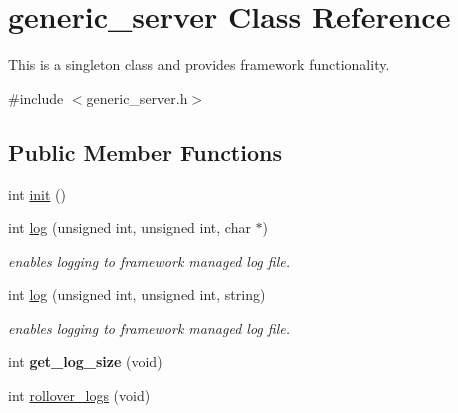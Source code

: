 \hypertarget{classgeneric__server}{\section{generic\-\_\-server Class Reference}
\label{classgeneric__server}
}


This is a singleton class and provides framework functionality.  




{\ttfamily \#include $<$generic\-\_\-server.\-h$>$}

\subsection*{Public Member Functions}
\begin{DoxyCompactItemize}
\item 
int \hyperlink{classgeneric__server_a62e814e9e573919dc2b94012caf835ad}{init} ()
\item 
\hypertarget{classgeneric__server_a860eaf6bbbf4796368a3c88df1a96b66}{int \hyperlink{classgeneric__server_a860eaf6bbbf4796368a3c88df1a96b66}{log} (unsigned int, unsigned int, char $\ast$)}\label{classgeneric__server_a860eaf6bbbf4796368a3c88df1a96b66}

\begin{DoxyCompactList}\small\item\em enables logging to framework managed log file. \end{DoxyCompactList}\item 
\hypertarget{classgeneric__server_a2c1ab2e6b558d2450b30c4fa27580f85}{int \hyperlink{classgeneric__server_a2c1ab2e6b558d2450b30c4fa27580f85}{log} (unsigned int, unsigned int, string)}\label{classgeneric__server_a2c1ab2e6b558d2450b30c4fa27580f85}

\begin{DoxyCompactList}\small\item\em enables logging to framework managed log file. \end{DoxyCompactList}\item 
\hypertarget{classgeneric__server_a54933f331e66e8678ed959725ae79681}{int {\bfseries get\-\_\-log\-\_\-size} (void)}\label{classgeneric__server_a54933f331e66e8678ed959725ae79681}

\item 
\hypertarget{classgeneric__server_a33c4919dde937ec28bf4a5d10db1da18}{int \hyperlink{classgeneric__server_a33c4919dde937ec28bf4a5d10db1da18}{rollover\-\_\-logs} (void)}\label{classgeneric__server_a33c4919dde937ec28bf4a5d10db1da18}


\end{DoxyCompactItemize}

